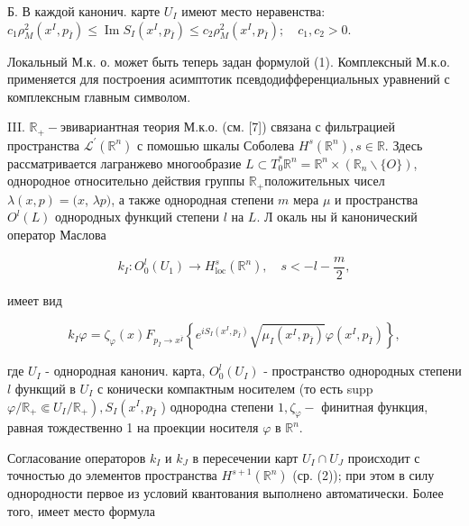 \documentclass[10pt]{article}
\begin{document}
Б. В каждой канонич. карте $U_{I}$ имеют место неравенства: $c_{1} \rho_{M}^{2}\left(x^{I}, p_{\bar{I}}\right) \leqslant \operatorname{Im} S_{I}\left(x^{I}, p_{\bar{I}}\right) \leqslant c_{2} \rho_{M}^{2}\left(x^{I}, p_{\bar{I}}\right) ; \quad c_{1}, c_{2}>0$.



Локальный М.к. о. может быть теперь задан формулой (1). Комплексный М.к.о. применяется для построения асимптотик псевдодифференциальных уравнений с комплексным главным символом.



III. $\mathbb{R}_{+}-$эвивариантная теория М.к.о. (см. [7]) связана с фильтрацией пространства $\mathscr{L}^{\prime}\left(\mathbb{R}^{n}\right)$ с помошью шкалы Соболева $H^{s}\left(\mathbb{R}^{n}\right), s \in \mathbb{R}$. Здесь рассматривается лагранжево многообразие $L \subset T_{0}^{*} \mathbb{R}^{n}=\mathbb{R}^{n} \times\left(\mathbb{R}_{n} \backslash\{O\}\right)$, однородное относительно действия группы $\mathbb{R}_{+}$положительных чисел $\lambda(x, p)=(x$, $\lambda p)$, а также однородная степени $m$ мера $\mu$ и пространства $O^{l}(L)$ однородных функций степени $l$ на $L$. Л окаль ны й канонический оператор Маслова



\[

k_{I}: O_{0}^{l}\left(U_{1}\right) \rightarrow H_{\operatorname{loc}}^{s}\left(\mathbb{R}^{n}\right), \quad s<-l-\frac{m}{2},

\]



имеет вид



\[

k_{I} \varphi=\zeta_{\varphi}(x) F_{p_{\bar{I}} \rightarrow x^{\bar{I}}}\left\{e^{i S_{I}\left(x^{I}, p_{\bar{I}}\right)} \sqrt{\mu_{I}\left(x^{I}, p_{\bar{I}}\right)} \varphi\left(x^{I}, p_{\bar{I}}\right)\right\},

\]



где $U_{I}$ - однородная канонич. карта, $O_{0}^{l}\left(U_{I}\right)$ - пространство однородных степени $l$ функщий в $U_{I}$ с конически компактным носителем (то есть supp $\left.\varphi / \mathbb{R}_{+} \Subset U_{I} / \mathbb{R}_{+}\right), S_{I}\left(x^{I}, p_{\bar{I}}\right.$ ) однородна степени $1, \zeta_{\varphi}-$ финитная функция, равная тождественно 1 на проекции носителя $\varphi$ в $\mathbb{R}^{n}$.



Согласование операторов $k_{I}$ и $k_{J}$ в пересечении карт $U_{I} \cap U_{J}$ происходит с точностью до элементов пространства $H^{s+1}\left(\mathbb{R}^{n}\right)$ (ср. (2)); при этом в силу однородности первое из условий квантования выполнено автоматически. Более того, имеет место формула
\end{document}
